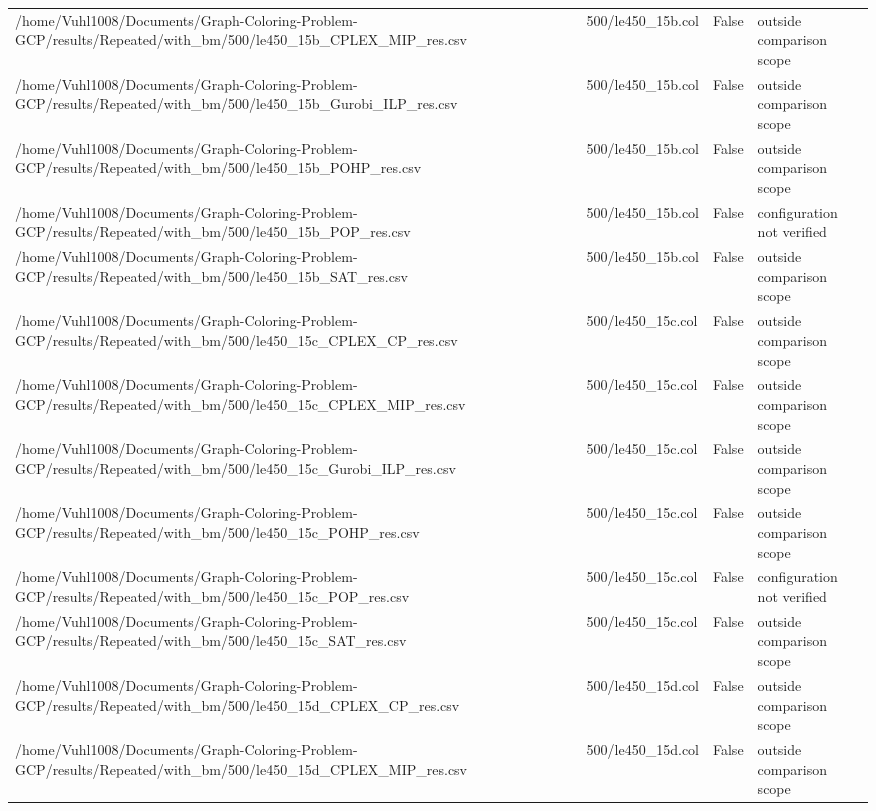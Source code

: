 \begin{table}[htbp]
\begin{tabular}{llll}
/home/Vuhl1008/Documents/Graph-Coloring-Problem-GCP/results/Repeated/with\_bm/500/le450\_15b\_CPLEX\_MIP\_res.csv & 500/le450\_15b.col & False & outside comparison scope \\
/home/Vuhl1008/Documents/Graph-Coloring-Problem-GCP/results/Repeated/with\_bm/500/le450\_15b\_Gurobi\_ILP\_res.csv & 500/le450\_15b.col & False & outside comparison scope \\
/home/Vuhl1008/Documents/Graph-Coloring-Problem-GCP/results/Repeated/with\_bm/500/le450\_15b\_POHP\_res.csv & 500/le450\_15b.col & False & outside comparison scope \\
/home/Vuhl1008/Documents/Graph-Coloring-Problem-GCP/results/Repeated/with\_bm/500/le450\_15b\_POP\_res.csv & 500/le450\_15b.col & False & configuration not verified \\
/home/Vuhl1008/Documents/Graph-Coloring-Problem-GCP/results/Repeated/with\_bm/500/le450\_15b\_SAT\_res.csv & 500/le450\_15b.col & False & outside comparison scope \\
/home/Vuhl1008/Documents/Graph-Coloring-Problem-GCP/results/Repeated/with\_bm/500/le450\_15c\_CPLEX\_CP\_res.csv & 500/le450\_15c.col & False & outside comparison scope \\
/home/Vuhl1008/Documents/Graph-Coloring-Problem-GCP/results/Repeated/with\_bm/500/le450\_15c\_CPLEX\_MIP\_res.csv & 500/le450\_15c.col & False & outside comparison scope \\
/home/Vuhl1008/Documents/Graph-Coloring-Problem-GCP/results/Repeated/with\_bm/500/le450\_15c\_Gurobi\_ILP\_res.csv & 500/le450\_15c.col & False & outside comparison scope \\
/home/Vuhl1008/Documents/Graph-Coloring-Problem-GCP/results/Repeated/with\_bm/500/le450\_15c\_POHP\_res.csv & 500/le450\_15c.col & False & outside comparison scope \\
/home/Vuhl1008/Documents/Graph-Coloring-Problem-GCP/results/Repeated/with\_bm/500/le450\_15c\_POP\_res.csv & 500/le450\_15c.col & False & configuration not verified \\
/home/Vuhl1008/Documents/Graph-Coloring-Problem-GCP/results/Repeated/with\_bm/500/le450\_15c\_SAT\_res.csv & 500/le450\_15c.col & False & outside comparison scope \\
/home/Vuhl1008/Documents/Graph-Coloring-Problem-GCP/results/Repeated/with\_bm/500/le450\_15d\_CPLEX\_CP\_res.csv & 500/le450\_15d.col & False & outside comparison scope \\
/home/Vuhl1008/Documents/Graph-Coloring-Problem-GCP/results/Repeated/with\_bm/500/le450\_15d\_CPLEX\_MIP\_res.csv & 500/le450\_15d.col & False & outside comparison scope \\

\end{tabular}
\end{table}
